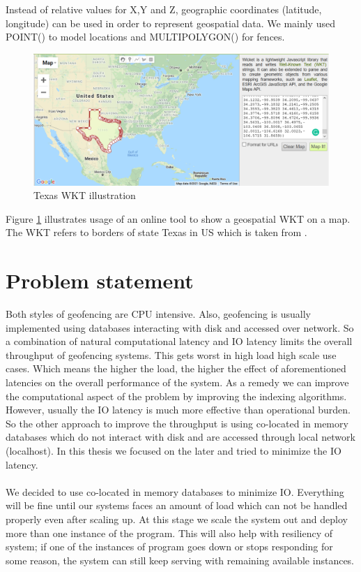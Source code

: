 \documentclass[a4]{report}
\begin{document}
    Instead of relative values for X,Y and Z, geographic coordinates (latitude, longitude) can be used in order to
    represent geospatial data.
    We mainly used POINT() to model locations and MULTIPOLYGON() for fences.

    \begin{figure}[ht]
        \centering
        \caption{Texas WKT illustration}
        \label{fig:texas}
        \includegraphics[width=\linewidth, scale=0.5]{images/texas.png}
    \end{figure}
    Figure \ref{fig:texas} illustrates usage of an online tool \cite{WKTtool} to show a geospatial WKT on a map.
    The WKT refers to borders of state Texas in US which is taken from \cite{WKTs}.


    \section{Problem statement}
    Both styles of geofencing are CPU intensive.
    Also, geofencing is usually implemented using databases interacting with disk and accessed over network.
    So a combination of natural computational latency and IO latency limits the overall throughput of geofencing systems.
    This gets worst in high load high scale use cases.
    Which means the higher the load, the higher the effect of aforementioned latencies on the overall performance
    of the system.
    As a remedy we can improve the computational aspect of the problem by improving the indexing algorithms.
    However, usually the IO latency is much more effective than operational burden.
    So the other approach to improve the throughput is using co-located in memory databases which do not interact
    with disk and are accessed through local network (localhost).
    In this thesis we focused on the later and tried to minimize the IO latency.

    \paragraph{}
    We decided to use co-located in memory databases to minimize IO.
    Everything will be fine until our systems faces an amount of load which can not be handled properly even after scaling up.
    At this stage we scale the system out and deploy more than one instance of the program.
    This will also help with resiliency of system;
    if one of the instances of program goes down or stops responding for some reason, the system can still keep
    serving with remaining available instances.
\end{document}

